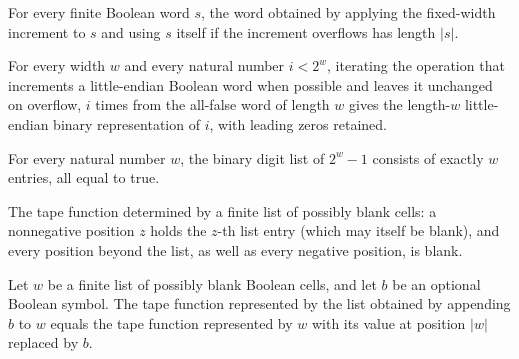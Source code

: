 \begin{lemma}
\label{Complexity.enumCont_step_length}
\leanok
{}
For every finite Boolean word $s$, the word obtained by applying the fixed-width
increment to $s$ and using $s$ itself if the increment overflows has length $|s|$.
\end{lemma}

\begin{lemma}
\label{Complexity.enumCont_orbit}
\leanok
{}
For every width $w$ and every natural number $i<2^w$, iterating the operation that
increments a little-endian Boolean word when possible and leaves it unchanged on
overflow, $i$ times from the all-false word of length $w$ gives the length-$w$
little-endian binary representation of $i$, with leading zeros retained.
\end{lemma}

\begin{lemma}
\label{Complexity.enumCont_fuel_bits}
\leanok
{}
For every natural number $w$, the binary digit list of $2^w-1$ consists of exactly $w$
entries, all equal to true.
\end{lemma}

\begin{definition}
\label{Complexity.enumCont_sparse}
\leanok
The tape function determined by a finite list of possibly blank cells: a
nonnegative position $z$ holds the $z$-th list entry (which may itself be blank),
and every position beyond the list, as well as every negative position, is blank.
\end{definition}

\begin{lemma}
\label{Complexity.enumCont_sparse_append}
\leanok
{}
Let $w$ be a finite list of possibly blank Boolean cells, and let $b$ be an optional
Boolean symbol. The tape function represented by the list obtained by appending $b$ to
$w$ equals the tape function represented by $w$ with its value at position $|w|$
replaced by $b$.
\end{lemma}

